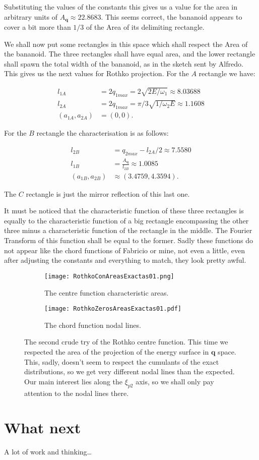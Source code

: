 \documentclass[a4paper,12pt]{article}
\newcommand{\qfase}{\mathbf{q}}
\begin{document}
Substituting the values of the constants this gives us a value
for the area in arbitrary units of $A_\qfase\approx 22.8683$. This
seems correct, the bananoid appears to cover a bit more than
$1/3$ of the Area of its delimiting rectangle. 

We shall now put some rectangles in this space
which shall respect the Area of the bananoid. The three rectangles
shall have equal area, and the lower rectangle shall spawn the 
total width of the bananoid, as in the sketch sent by Alfredo. This gives us
the next values for Rothko projection. For the $A$ rectangle we have:

\begin{align}
l_{1A} &= 2 q_{1max}= 2 \sqrt{2 E/ \omega_1} \approx 8.03688 \\
l_{2A} &= 2 q_{1max}= \pi/3 \sqrt{1/ \omega_2 E} \approx 1.1608 \\
(a_{1A} ,a_{2A}) & = (0, 0). 
\end{align}

For the $B$ rectangle the characterisation is as follows:

\begin{align}
l_{2B} &= q_{2max}-l_{2A}/2 \approx 7.5580 \\
l_{1B} &=\frac{A_\qfase} {l_{2B}} \approx 1.0085 \\ 
(a_{1B} , a_{2B}) & \approx  (3.4759, 4.3594). 
\end{align}

The $C$ rectangle is just the mirror reflection of this last one. 

It must be noticed that the characteristic function of these
three rectangles is equally to the characteristic function of a big
rectangle encompassing the other three minus a characteristic function
of the rectangle in the middle. The Fourier Transform of this
function shall be equal to the former. Sadly these functions
do not appear like the chord functions
of Fabricio or mine, not even a little, even after adjusting the
constants and everything to match, they look pretty awful.


\begin{figure}[H]
  \centering
  \begin{subfigure}[b]{0.45\textwidth}
    \centering
          \texttt{[image: RothkoConAreasExactas01.png]}
                \caption{The centre function characteristic areas.}
                \label{FabZeros}
  \end{subfigure}%
\begin{subfigure}[b]{0.45\textwidth}
    \centering
          \texttt{[image: RothkoZerosAreasExactas01.pdf]}
                \caption{The chord function nodal lines.}
                \label{KarelZeros}
  \end{subfigure}%
\caption{The second crude try of the Rothko centre function. This time
we respected the area of the projection of the energy surface in $\qfase$ space.
This, sadly, doesn't seem to respect the cumulants of the exact distributions,
so we get very different nodal lines than the expected. Our main interest
lies along the $\xi_{p2}$ axis, so we shall only pay attention
to the nodal lines there. 
}
\label{RectangulosAreas}
\end{figure}

\section{What next}

A lot of work and thinking\ldots
\end{document}
